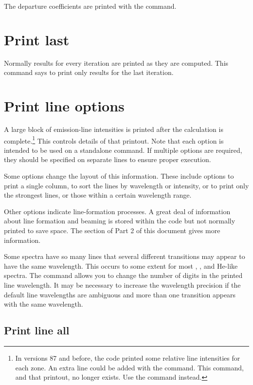 The departure coefficients are printed with the  command.

\section{Print last}

Normally results for every iteration are printed as they are computed.
This command says to print only results for the last iteration.

\section{Print line options}

A large block of emission-line intensities is printed after the
calculation is complete.\footnote{In versions 87 and before, the code printed some relative line
intensities for each zone.  An extra line could be added with the  command.  This command, and that printout, no longer exists.  Use the
 command instead.} This controls details of that printout. Note that each option is intended to be used on a standalone command. If multiple options are required, they should be specified on separate lines to ensure proper execution.



Some options change the layout of this information.
These include options
to print a single column, to sort the lines by wavelength or intensity,
or to print only the strongest lines, or those within a certain wavelength
range.

Other options indicate line-formation processes.
A great deal of
information about line formation and beaming is stored within the code but
not normally printed to save space.
The section of Part 2 of this document
 gives more information.

Some spectra have so many lines that several different transitions may
appear to have the same wavelength.
This occurs to some extent for most
\htwo, \feii, and He-like spectra.
The  command allows you to change the number of digits in
the printed line wavelength.
It may be necessary to increase the wavelength
precision if the default line wavelengths are ambiguous and more than one
transition appears with the same wavelength.

\subsection{Print line all}

